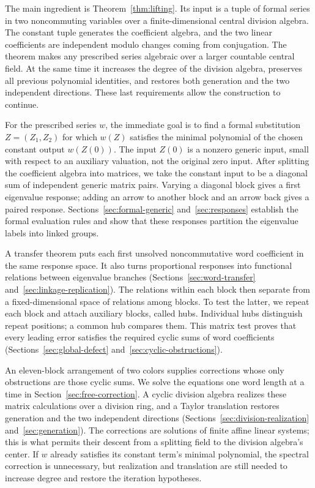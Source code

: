 \documentclass[11pt]{article}
\theoremstyle{definition}
\theoremstyle{remark}
\numberwithin{equation}{section}
\begin{document}
The main ingredient is Theorem~\ref{thm:lifting}. Its input is a tuple of
formal series in two noncommuting variables over a finite-dimensional
central division algebra. The constant tuple generates the coefficient
algebra, and the two linear coefficients are independent modulo changes
coming from conjugation. The theorem makes any prescribed series
algebraic over a larger countable central field. At the same time it
increases the degree of the division algebra, preserves all previous
polynomial identities, and restores both generation and the two independent
directions. These last requirements allow the construction to continue.

For the prescribed series $w$, the immediate goal is to find a formal
substitution $Z=(Z_1,Z_2)$ for which $w(Z)$ satisfies the minimal
polynomial of the chosen constant output $w(Z(0))$. The input $Z(0)$
is a nonzero generic input, small with respect to an auxiliary valuation,
not the original zero input.
After splitting
the coefficient algebra into matrices, we take the constant input to be
a diagonal sum of independent generic matrix pairs. Varying a diagonal
block gives a first eigenvalue response; adding an arrow to another block
and an arrow back gives a paired response. Sections~\ref{sec:formal-generic}
and~\ref{sec:responses} establish the formal evaluation rules and show that
these responses partition the eigenvalue labels into linked groups.

A transfer theorem puts each first unsolved noncommutative word coefficient
in the same response space. It also turns proportional responses into
functional relations between eigenvalue branches
(Sections~\ref{sec:word-transfer} and~\ref{sec:linkage-replication}).
The relations within each block then separate from a fixed-dimensional
space of relations among blocks. To test the latter, we repeat each block
and attach auxiliary blocks, called hubs. Individual hubs distinguish
repeat positions; a common hub compares them. This matrix test proves
that every leading error satisfies the required cyclic sums of word
coefficients (Sections~\ref{sec:global-defect} and~\ref{sec:cyclic-obstructions}).

An eleven-block arrangement of two colors supplies corrections whose
only obstructions are those cyclic sums. We solve the equations one word
length at a time in Section~\ref{sec:free-correction}. A cyclic division
algebra realizes these matrix calculations over a division ring, and a
Taylor translation restores generation and the two independent directions
(Sections~\ref{sec:division-realization} and~\ref{sec:generation}).
The corrections are solutions of finite affine linear systems; this is
what permits their descent from a splitting field to the division
algebra's center. If $w$ already satisfies its constant term's minimal
polynomial, the spectral correction is unnecessary, but realization
and translation are still needed to increase degree and restore the
iteration hypotheses.
\end{document}
